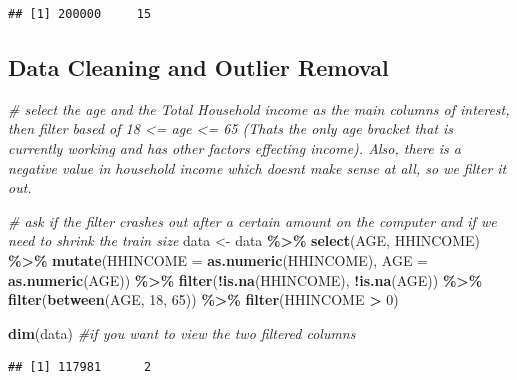 \documentclass[
]{article}
\newenvironment{Shaded}{\begin{snugshade}}{\end{snugshade}}
\newcommand{\AttributeTok}[1]{\textcolor[rgb]{0.13,0.29,0.53}{#1}}
\newcommand{\CommentTok}[1]{\textcolor[rgb]{0.56,0.35,0.01}{\textit{#1}}}
\newcommand{\DecValTok}[1]{\textcolor[rgb]{0.00,0.00,0.81}{#1}}
\newcommand{\FunctionTok}[1]{\textcolor[rgb]{0.13,0.29,0.53}{\textbf{#1}}}
\newcommand{\NormalTok}[1]{#1}
\newcommand{\OtherTok}[1]{\textcolor[rgb]{0.56,0.35,0.01}{#1}}
\newcommand{\SpecialCharTok}[1]{\textcolor[rgb]{0.81,0.36,0.00}{\textbf{#1}}}
\begin{document}
\begin{verbatim}
## [1] 200000     15
\end{verbatim}

\subsection{Data Cleaning and Outlier
Removal}\label{data-cleaning-and-outlier-removal}

\begin{Shaded}
\begin{Highlighting}[]
\CommentTok{\# select the age and the Total Household income as the main columns of interest, then filter based of 18 \textless{}= age \textless{}= 65 (Thats the only age bracket that is currently working and has other factors effecting income). Also, there is a negative value in household income which doesn\textquotesingle{}t make sense at all, so we filter it out. }

\CommentTok{\# ask if the filter crashes out after a certain amount on the computer and if we need to shrink the train size}
\NormalTok{data }\OtherTok{\textless{}{-}}\NormalTok{ data }\SpecialCharTok{\%\textgreater{}\%}
  \FunctionTok{select}\NormalTok{(AGE, HHINCOME) }\SpecialCharTok{\%\textgreater{}\%}
  \FunctionTok{mutate}\NormalTok{(}\AttributeTok{HHINCOME =} \FunctionTok{as.numeric}\NormalTok{(HHINCOME), }\AttributeTok{AGE =} \FunctionTok{as.numeric}\NormalTok{(AGE)) }\SpecialCharTok{\%\textgreater{}\%}
  \FunctionTok{filter}\NormalTok{(}\SpecialCharTok{!}\FunctionTok{is.na}\NormalTok{(HHINCOME), }\SpecialCharTok{!}\FunctionTok{is.na}\NormalTok{(AGE)) }\SpecialCharTok{\%\textgreater{}\%}
  \FunctionTok{filter}\NormalTok{(}\FunctionTok{between}\NormalTok{(AGE, }\DecValTok{18}\NormalTok{, }\DecValTok{65}\NormalTok{)) }\SpecialCharTok{\%\textgreater{}\%}
  \FunctionTok{filter}\NormalTok{(HHINCOME }\SpecialCharTok{\textgreater{}} \DecValTok{0}\NormalTok{)}

\FunctionTok{dim}\NormalTok{(data)  }\CommentTok{\#if you want to view the two filtered columns}
\end{Highlighting}
\end{Shaded}

\begin{verbatim}
## [1] 117981      2
\end{verbatim}
\end{document}
